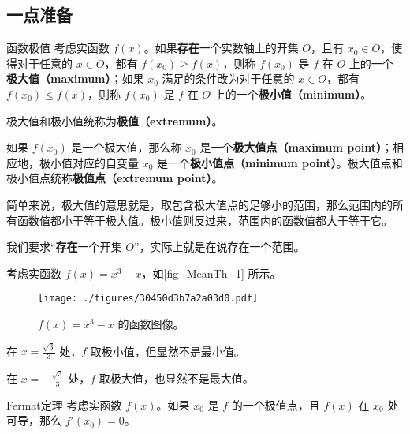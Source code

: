 

\subsection{一点准备}


\begin{definition}{函数极值}
考虑实函数 $f(x)$。如果\textbf{存在}一个实数轴上的开集 $O$，且有 $x_0\in O$，使得对于任意的 $x\in O$，都有 $f(x_0)\geq f(x)$，则称 $f(x_0)$ 是 $f$ 在 $O$ 上的一个\textbf{极大值（maximum）}；如果 $x_0$ 满足的条件改为对于任意的 $x\in O$，都有 $f(x_0)\leq f(x)$，则称 $f(x_0)$ 是 $f$ 在 $O$ 上的一个\textbf{极小值（minimum）}。

极大值和极小值统称为\textbf{极值（extremum）}。

如果 $f(x_0)$ 是一个极大值，那么称 $x_0$ 是一个\textbf{极大值点（maximum point）}；相应地，极小值对应的自变量 $x_0$ 是一个\textbf{极小值点（minimum point）}。极大值点和极小值点统称\textbf{极值点（extremum point）}。
\end{definition}


简单来说，极大值的意思就是，取包含极大值点的足够小的范围，那么范围内的所有函数值都小于等于极大值。极小值则反过来，范围内的函数值都大于等于它。

我们要求“\textbf{存在}一个开集 $O$”，实际上就是在说存在一个范围。

\begin{example}{}\label{ex_MeanTh_1}
考虑实函数 $f(x)=x^3-x$，如\autoref{fig_MeanTh_1} 所示。

\begin{figure}[ht]
\centering
\texttt{[image: ./figures/30450d3b7a2a03d0.pdf]}
\caption{$f(x)=x^3-x$ 的函数图像。} \label{fig_MeanTh_1}
\end{figure}

在 $x=\frac{\sqrt{3}}{3}$ 处，$f$ 取极小值，但显然不是最小值。

在 $x=-\frac{\sqrt{3}}{3}$ 处，$f$ 取极大值，也显然不是最大值。


\end{example}


\begin{theorem}{Fermat定理}\label{the_MeanTh_1}
考虑实函数 $f(x)$。如果 $x_0$ 是 $f$ 的一个极值点，且 $f(x)$ 在 $x_0$ 处可导，那么 $f'(x_0)=0$。
\end{theorem}

